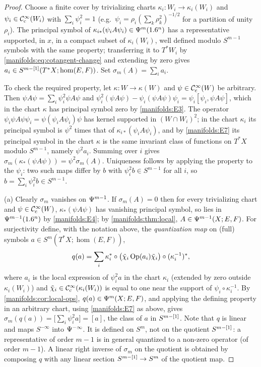 \begin{proof}
Choose a finite cover by trivializing charts $\kappa_i:W_i\to\kappa_i(W_i)$ and
$\psi_i\in\mathcal{C}^\infty_{\mathrm{c}}(W_i)$ with $\sum_i\psi_i^2=1$ (e.g.\ $\psi_i=\rho_i(\sum_k\rho_k^2)^{-1/2}$
for a partition of unity $\rho_i$). The principal symbol of
$\kappa_{i*}(\psi_iA\psi_i)\in\Psi^{m}(1.6^n)$ has a representative supported, in $x$,
in a compact subset of $\kappa_i(W_i)$, well defined modulo $S^{m-1}$ symbols with
the same property; transferring it to $T^*W_i$ by \eqref{manifolds:eq:cotangent-change}
and extending by zero gives $a_i\in S^{m-[1]}(T^*X;\hom(E,F))$. Set
$\sigma_m(A)=\sum_ia_i$.

To check the required property, let $\kappa:W\to\kappa(W)$ and $\psi\in\mathcal{C}^\infty_{\mathrm{c}}(W)$ be
arbitrary. Then $\psi A\psi=\sum_i\psi_i^2\psi A\psi$ and
$\psi_i^2(\psi A\psi)-\psi_i(\psi A\psi)\psi_i=\psi_i[\psi_i,\psi A\psi]$, which in
the chart $\kappa$ has principal symbol zero by \ref{manifolds:E3}. The operator
$\psi_i\psi A\psi\psi_i=\psi(\psi_iA\psi_i)\psi$ has kernel supported in
$(W\cap W_i)^2$; in the chart $\kappa_i$ its principal symbol is $\psi^2$ times that
of $\kappa_{i*}(\psi_iA\psi_i)$, and by \ref{manifolds:E7} its principal symbol in
the chart $\kappa$ is the same invariant class of functions on $T^*X$ modulo
$S^{m-1}$, namely $\psi^2a_i$.
Summing over $i$ gives $\sigma_m(\kappa_*(\psi A\psi))=\psi^2\sigma_m(A)$. Uniqueness
follows by applying the property to the $\psi_i$: two such maps differ by $b$ with
$\psi_i^2b\in S^{m-1}$ for all $i$, so $b=\sum_i\psi_i^2b\in S^{m-1}$.

(a) Clearly $\sigma_m$ vanishes on $\Psi^{m-1}$. If $\sigma_m(A)=0$ then for every
trivializing chart and $\psi\in\mathcal{C}^\infty_{\mathrm{c}}(W)$, $\kappa_*(\psi A\psi)$ has vanishing
principal symbol, so lies in $\Psi^{m-1}(1.6^n)$ by \ref{manifolds:E4}; by
\cref{manifolds:thm:local}, $A\in\Psi^{m-1}(X;E,F)$. For surjectivity define, with
the notation above, the \emph{quantization map} on (full) symbols
$a\in S^m(T^*X;\hom(E,F))$,
\begin{equation}\label{manifolds:eq:quantization}
q(a)=\sum_i\kappa_i^*\circ\big(\tilde\chi_i\operatorname{Op}(a_i)\tilde\chi_i\big)\circ(\kappa_i^{-1})^*,
\end{equation}
where $a_i$ is the local expression of $\psi_i^2a$ in the chart $\kappa_i$ (extended
by zero outside $\kappa_i(W_i)$) and $\tilde\chi_i\in\mathcal{C}^\infty_{\mathrm{c}}(\kappa_i(W_i))$ is equal to
one near the support of $\psi_i\circ\kappa_i^{-1}$. By
\cref{manifolds:cor:local-ops}, $q(a)\in\Psi^{m}(X;E,F)$, and applying the defining
property in an arbitrary chart, using \ref{manifolds:E7} as above, gives
$\sigma_m(q(a))=\big[\sum_i\psi_i^2a\big]=[a]$, the class of $a$ in $S^{m-[1]}$. Note that
$q$ is linear and maps $S^{-\infty}$ into $\Psi^{-\infty}$. It is defined on $S^m$, not on
the quotient $S^{m-[1]}$: a representative of order $m-1$ is in general quantized to a
non-zero operator (of order $m-1$). A linear right inverse of $\sigma_m$ on the quotient
is obtained by composing $q$ with any linear section $S^{m-[1]}\to S^m$ of the quotient map.


\end{proof}
